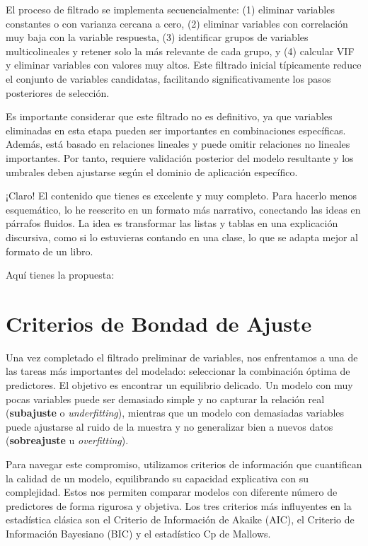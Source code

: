 \documentclass[
  letterpaper,
  DIV=11,
  numbers=noendperiod]{scrreprt}
\begin{document}
El proceso de filtrado se implementa secuencialmente: (1) eliminar
variables constantes o con varianza cercana a cero, (2) eliminar
variables con correlación muy baja con la variable respuesta, (3)
identificar grupos de variables multicolineales y retener solo la más
relevante de cada grupo, y (4) calcular VIF y eliminar variables con
valores muy altos. Este filtrado inicial típicamente reduce el conjunto
de variables candidatas, facilitando significativamente los pasos
posteriores de selección.

Es importante considerar que este filtrado no es definitivo, ya que
variables eliminadas en esta etapa pueden ser importantes en
combinaciones específicas. Además, está basado en relaciones lineales y
puede omitir relaciones no lineales importantes. Por tanto, requiere
validación posterior del modelo resultante y los umbrales deben
ajustarse según el dominio de aplicación específico.

¡Claro! El contenido que tienes es excelente y muy completo. Para
hacerlo menos esquemático, lo he reescrito en un formato más narrativo,
conectando las ideas en párrafos fluidos. La idea es transformar las
listas y tablas en una explicación discursiva, como si lo estuvieras
contando en una clase, lo que se adapta mejor al formato de un libro.

Aquí tienes la propuesta:

\section{Criterios de Bondad de
Ajuste}\label{criterios-de-bondad-de-ajuste}

Una vez completado el filtrado preliminar de variables, nos enfrentamos
a una de las tareas más importantes del modelado: seleccionar la
combinación óptima de predictores. El objetivo es encontrar un
equilibrio delicado. Un modelo con muy pocas variables puede ser
demasiado simple y no capturar la relación real (\textbf{subajuste} o
\emph{underfitting}), mientras que un modelo con demasiadas variables
puede ajustarse al ruido de la muestra y no generalizar bien a nuevos
datos (\textbf{sobreajuste} u \emph{overfitting}).

Para navegar este compromiso, utilizamos criterios de información que
cuantifican la calidad de un modelo, equilibrando su capacidad
explicativa con su complejidad. Estos nos permiten comparar modelos con
diferente número de predictores de forma rigurosa y objetiva. Los tres
criterios más influyentes en la estadística clásica son el Criterio de
Información de Akaike (AIC), el Criterio de Información Bayesiano (BIC)
y el estadístico Cp de Mallows.
\end{document}
